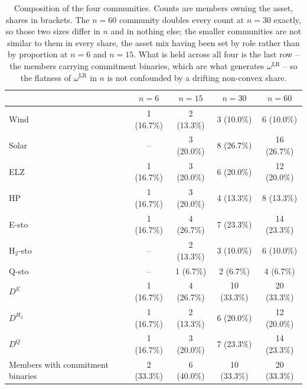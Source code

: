 \begin{table}[!t]
\caption{Composition of the four communities. Counts are members owning the asset, shares in brackets. The $n=60$ community doubles every count at $n=30$ exactly, so those two sizes differ in $n$ and in nothing else; the smaller communities are not similar to them in every share, the asset mix having been set by role rather than by proportion at $n=6$ and $n=15$. What is held across all four is the last row -- the members carrying commitment binaries, which are what generates $\omega^{\mathrm{LR}}$ -- so the flatness of $\omega^{\mathrm{LR}}$ in $n$ is not confounded by a drifting non-convex share.}
\label{tab:composition}
\centering
\small
\begin{tabular}{@{}lcccc@{}}
\toprule
 & $n=6$ & $n=15$ & $n=30$ & $n=60$ \\
\midrule
Wind & 1 (16.7\%) & 2 (13.3\%) & 3 (10.0\%) & 6 (10.0\%) \\
Solar & -- & 3 (20.0\%) & 8 (26.7\%) & 16 (26.7\%) \\
ELZ & 1 (16.7\%) & 3 (20.0\%) & 6 (20.0\%) & 12 (20.0\%) \\
HP & 1 (16.7\%) & 3 (20.0\%) & 4 (13.3\%) & 8 (13.3\%) \\
E-sto & 1 (16.7\%) & 4 (26.7\%) & 7 (23.3\%) & 14 (23.3\%) \\
H$_2$-sto & -- & 2 (13.3\%) & 3 (10.0\%) & 6 (10.0\%) \\
Q-sto & -- & 1 (6.7\%) & 2 (6.7\%) & 4 (6.7\%) \\
$D^{E}$ & 1 (16.7\%) & 4 (26.7\%) & 10 (33.3\%) & 20 (33.3\%) \\
$D^{H_2}$ & 1 (16.7\%) & 2 (13.3\%) & 6 (20.0\%) & 12 (20.0\%) \\
$D^{Q}$ & 1 (16.7\%) & 3 (20.0\%) & 7 (23.3\%) & 14 (23.3\%) \\
\midrule
Members with commitment binaries & 2 (33.3\%) & 6 (40.0\%) & 10 (33.3\%) & 20 (33.3\%) \\
\bottomrule
\end{tabular}
\end{table}

